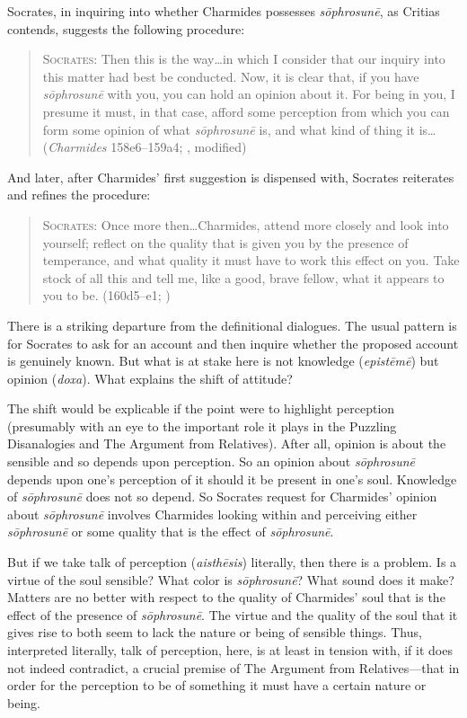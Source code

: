 Socrates, in inquiring into whether Charmides possesses \emph{sōphrosunē}, as Critias contends, suggests the following procedure:
\begin{quote}
	\textsc{Socrates}: Then this is the way\dots in which I consider that our inquiry into this matter had best be conducted. Now, it is clear that, if you have \emph{sōphrosunē} with you, you can hold an opinion about it. For being in you, I presume it must, in that case, afford some perception from which you can form some opinion of what \emph{sōphrosunē} is, and what kind of thing it is\ldots (\emph{Charmides} 158e6–159a4; \citealt[27]{Lamb:1927qw}, modified)
\end{quote}
And later, after Charmides' first suggestion is dispensed with, Socrates reiterates and refines the procedure:
\begin{quote}
	\textsc{Socrates}: Once more then\ldots Charmides, attend more closely and look into yourself; reflect on the quality that is given you by the presence of temperance, and what quality it must have to work this effect on you. Take stock of all this and tell me, like a good, brave fellow, what it appears to you to be. (160d5–e1; \citealt{Lamb:1927qw})
\end{quote}
There is a striking departure from the definitional dialogues. The usual pattern is for Socrates to ask for an account and then inquire whether the proposed account is genuinely known. But what is at stake here is not knowledge (\emph{epistēmē}) but opinion (\emph{doxa}). What explains the shift of attitude?

The shift would be explicable if the point were to highlight perception (presumably with an eye to the important role it plays in the Puzzling Disanalogies and The Argument from Relatives). After all, opinion is about the sensible and so depends upon perception. So an opinion about \emph{sōphrosunē} depends upon one's perception of it should it be present in one's soul. Knowledge of \emph{sōphrosunē} does not so depend. So Socrates request for Charmides' opinion about \emph{sōphrosunē} involves Charmides looking within and perceiving either \emph{sōphrosunē} or some quality that is the effect of \emph{sōphrosunē}. 

But if we take talk of perception (\emph{aisthēsis}) literally, then there is a problem. Is a virtue of the soul sensible? What color is \emph{sōphrosunē}? What sound does it make? Matters are no better with respect to the quality of Charmides' soul that is the effect of the presence of \emph{sōphrosunē}. The virtue and the quality of the soul that it gives rise to both seem to lack the nature or being of sensible things. Thus, interpreted literally, talk of perception, here, is at least in tension with, if it does not indeed contradict, a crucial premise of The Argument from Relatives—that in order for the perception to be of something it must have a certain nature or being.

